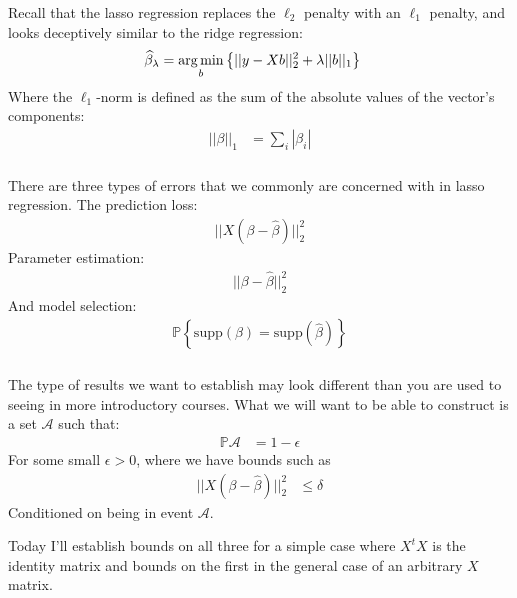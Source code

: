 \begin{frame}[fragile] \frametitle{}

Recall that the lasso regression replaces the $\ell_2$ penalty with an $\ell_1$ penalty,
and looks deceptively similar to the ridge regression:
\begin{align*}
\widehat{\beta}_\lambda &= \mathop{\mathrm{arg\,min}}_b \left\{ || y - Xb ||_2^2 + \lambda ||b||_1 \right\}
\end{align*}
Where the $\ell_1$-norm is defined as the sum of the absolute values of the
vector's components:
\begin{align*}
|| \beta ||_1 &= \sum_i | \beta_i |
\end{align*}

\end{frame}

\begin{frame}[fragile] \frametitle{}

There are three types of errors that we commonly are concerned
with in lasso regression. \pause The prediction loss:
\begin{align*}
|| X (\beta - \widehat{\beta}) ||_2^2
\end{align*}
\pause Parameter estimation:
\begin{align*}
|| \beta - \widehat{\beta} ||_2^2
\end{align*}
\pause And model selection:
\begin{align*}
\mathbb{P} \left\{ \text{supp} (\beta) = \text{supp} (\widehat{\beta}) \right\}
\end{align*}

\end{frame}

\begin{frame}[fragile] \frametitle{}

The type of results we want to establish may look different than
you are used to seeing in more introductory courses.
\pause What we will want to be able to construct is a set
$\mathcal{A}$ such that:
\begin{align*}
\mathbb{P} \mathcal{A} &= 1 - \epsilon
\end{align*}
For some small $\epsilon > 0$, where we have bounds such as
\begin{align*}
|| X (\beta - \widehat{\beta}) ||_2^2 &\leq \delta
\end{align*}
Conditioned on being in event $\mathcal{A}$.

\pause Today I'll establish bounds on all three for a simple case
where $X^tX$ is the identity matrix and bounds on the first in the
general case of an arbitrary $X$ matrix.

\end{frame}

